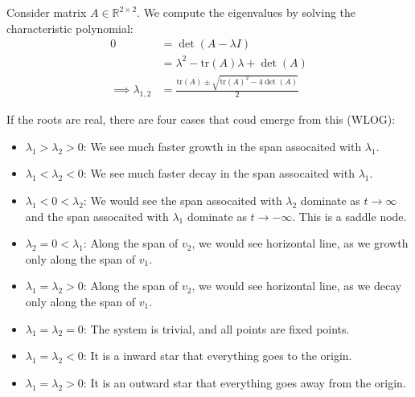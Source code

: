 \documentclass[11pt]{article}
\begin{document}
\begin{definition}
    Consider matrix $A \in \mathbb{R}^{2 \times 2}$. We compute the eigenvalues by solving the characteristic polynomial:
    \begin{align*}
    0 &= \det(A - \lambda I) \\
    &= \lambda^2 - \text{tr}(A)\lambda + \det(A) \\
    \implies \lambda_{1,2} &= \frac{\text{tr}(A) \pm \sqrt{\text{tr}(A)^2 - 4\det(A)}}{2}
    \end{align*}

    If the roots are real, there are four cases that coud emerge from this (WLOG): 
    \begin{itemize}
        \item $\lambda_1 > \lambda_2 > 0$: We see much faster growth in the span assocaited with $\lambda_1$.
        \item $\lambda_1 < \lambda_2 < 0$: We see much faster decay in the span assocaited with $\lambda_1$.
        \item $\lambda_1 < 0 < \lambda_2$: We would see the span assocaited with $\lambda_2$ dominate as $t \to \infty$ and the span assocaited with $\lambda_1$ dominate as $t \to -\infty$. This is a saddle node.
        \item $\lambda_2  = 0 < \lambda_1$: Along the span of $v_2$, we would see horizontal line, as we growth only along the span of $v_1$. 
        \item $\lambda_1 = \lambda_2 > 0$: Along the span of $v_2$, we would see horizontal line, as we decay only along the span of $v_1$.
        \item $\lambda_1 = \lambda_2 = 0$: The system is trivial, and all points are fixed points.
        \item $\lambda_1 = \lambda_2 < 0$: It is a inward star that everything goes to the origin.
        \item $\lambda_1 = \lambda_2 > 0$: It is an outward star that everything goes away from the origin.
    \end{itemize}
\end{definition}
\end{document}
